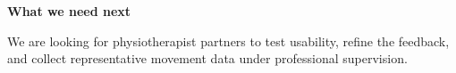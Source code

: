 \documentclass[10pt,a4paper]{article}
\begin{document}
\vfill

\colorbox{PitchPale}{%
  \parbox{\dimexpr\linewidth-2\fboxsep\relax}{%
    \vspace{2.3mm}
    {\color{PitchTeal}\bfseries\fontsize{11.2}{12.6}\selectfont What we need next}\par
    \vspace{0.7mm}
    We are looking for physiotherapist partners to test usability, refine the feedback, and collect representative movement data under professional supervision.
    \vspace{2.3mm}
  }%
}
\end{document}
